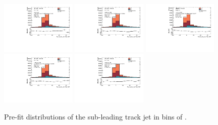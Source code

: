 \begin{figure}[htbp]
  \centering
 \includegraphics[width=0.32\textwidth]{figures/gbb/Sub_Sd0_Fits/Canv_PreFit_0-Deltaphi-0628_LpT_INF_SpT_INF_coarse_y.pdf}
 \includegraphics[width=0.32\textwidth]{figures/gbb/Sub_Sd0_Fits/Canv_PreFit_0628-Deltaphi-1256_LpT_INF_SpT_INF_coarse_y.pdf}
 \includegraphics[width=0.32\textwidth]{figures/gbb/Sub_Sd0_Fits/Canv_PreFit_1256-Deltaphi-1884_LpT_INF_SpT_INF_coarse_y.pdf}\\
 \includegraphics[width=0.32\textwidth]{figures/gbb/Sub_Sd0_Fits/Canv_PreFit_1884-Deltaphi-2512_LpT_INF_SpT_INF_coarse_y.pdf}
 \includegraphics[width=0.32\textwidth]{figures/gbb/Sub_Sd0_Fits/Canv_PreFit_2512-Deltaphi-3140_LpT_INF_SpT_INF_coarse_y.pdf}

\caption{Pre-fit \subsdzero distributions of the sub-leading track jet in bins of \dphi. }
  \label{fig:dphi-prefits-subleading}
\end{figure}

